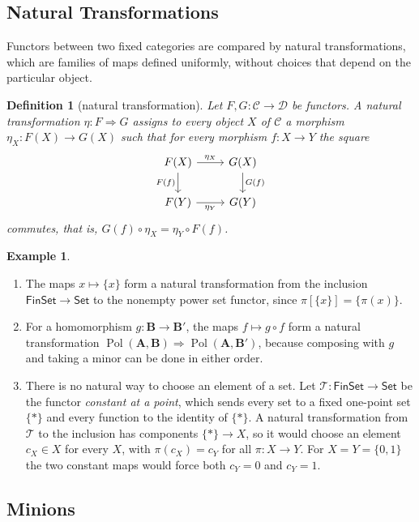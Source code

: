 \documentclass[11pt]{article}
\theoremstyle{plain}
\newtheorem{definition}[theorem]{Definition}
\theoremstyle{definition}
\newtheorem{example}[theorem]{Example}
\newcommand{\cat}[1]{\mathsf{#1}}
\newcommand{\Set}{\cat{Set}}
\newcommand{\FinSet}{\cat{FinSet}}
\newcommand{\Pol}{\operatorname{Pol}}
\newcommand{\bA}{\mathbf{A}}
\newcommand{\bB}{\mathbf{B}}
\newcommand{\T}{\mathscr{T}}
\begin{document}
\subsection{Natural Transformations}\label{sec:nat}

Functors between two fixed categories are compared by natural transformations, which are families of maps defined uniformly, without choices that depend on the particular object.

\begin{definition}[natural transformation]
Let $F,G\colon\mathcal C\to\mathcal D$ be functors. A \emph{natural transformation} $\eta\colon F\Rightarrow G$ assigns to every object $X$ of $\mathcal C$ a morphism $\eta_X\colon F(X)\to G(X)$ such that for every morphism $f\colon X\to Y$ the square
\[
\begin{tikzcd}
F(X)\arrow[r,"\eta_X"]\arrow[d,"F(f)"'] & G(X)\arrow[d,"G(f)"]\\
F(Y)\arrow[r,"\eta_Y"'] & G(Y)
\end{tikzcd}
\]
commutes, that is, $G(f)\circ\eta_X=\eta_Y\circ F(f)$.
\end{definition}

\begin{example}\label{ex:nat}\leavevmode
\begin{enumerate}[label=(\alph*)]
  \item The maps $x\mapsto\{x\}$ form a natural transformation from the inclusion $\FinSet\to\Set$ to the nonempty power set functor, since $\pi[\{x\}]=\{\pi(x)\}$.
  \item For a homomorphism $g\colon\bB\to\bB'$, the maps $f\mapsto g\circ f$ form a natural transformation $\Pol(\bA,\bB)\Rightarrow\Pol(\bA,\bB')$, because composing with $g$ and taking a minor can be done in either order.
  \item There is no natural way to choose an element of a set. Let $\T\colon\FinSet\to\Set$ be the functor \emph{constant at a point}, which sends every set to a fixed one-point set $\{\ast\}$ and every function to the identity of $\{\ast\}$. A natural transformation from $\T$ to the inclusion has components $\{\ast\}\to X$, so it would choose an element $c_X\in X$ for every $X$, with $\pi(c_X)=c_Y$ for all $\pi\colon X\to Y$. For $X=Y=\{0,1\}$ the two constant maps would force both $c_Y=0$ and $c_Y=1$.
\end{enumerate}
\end{example}

\subsection{Minions}\label{sec:minions}
\end{document}
